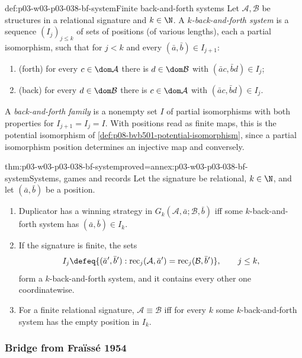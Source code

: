 \begin{hbdefinition}{def:p03-w03-p03-038-bf-system}{Finite back-and-forth systems}
Let \(\mathcal A,\mathcal B\) be structures in a relational signature and
\(k\in\N\). A \emph{\(k\)-back-and-forth system} is a sequence
\((I_j)_{j\le k}\) of sets of positions (of various lengths), each a partial
isomorphism, such that for \(j<k\) and every \((\bar a,\bar b)\in I_{j+1}\):
\begin{enumerate}
\item (forth) for every \(c\in\dom\mathcal A\) there is
      \(d\in\dom\mathcal B\) with \((\bar ac,\bar bd)\in I_j\);
\item (back) for every \(d\in\dom\mathcal B\) there is
      \(c\in\dom\mathcal A\) with \((\bar ac,\bar bd)\in I_j\).
\end{enumerate}
A \emph{back-and-forth family} is a nonempty set \(I\) of partial
isomorphisms with both properties for \(I_{j+1}=I_j=I\). With positions read as
finite maps, this is the potential isomorphism of
\cref{def:p08-bvb501-potential-isomorphism}, since a partial isomorphism
position determines an injective map and conversely.
\end{hbdefinition}

\begin{hbtheorem}{thm:p03-w03-p03-038-bf-system}{proved=annex:p03-w03-p03-038-bf-system}{Systems, games and records}
Let the signature be relational, \(k\in\N\), and let
\((\bar a,\bar b)\) be a position.
\begin{enumerate}
\item Duplicator has a winning strategy in
      \(G_k(\mathcal A,\bar a;\mathcal B,\bar b)\) iff some
      \(k\)-back-and-forth system has \((\bar a,\bar b)\in I_k\).
\item If the signature is finite, the sets
      \[
       I_j\defeq\{(\bar a',\bar b'):\operatorname{rec}_j(\mathcal A,\bar a')
       =\operatorname{rec}_j(\mathcal B,\bar b')\},\qquad j\le k,
      \]
      form a \(k\)-back-and-forth system, and it contains every other one
      coordinatewise.
\item For a finite relational signature, \(\mathcal A\equiv\mathcal B\)
      iff for every \(k\) some \(k\)-back-and-forth system has the empty
      position in \(I_k\).
\end{enumerate}
\end{hbtheorem}

\subsubsection{Bridge from Fra\"iss\'e 1954}
\label{sec:p03-w03-p03-038-fraisse-bridge}

